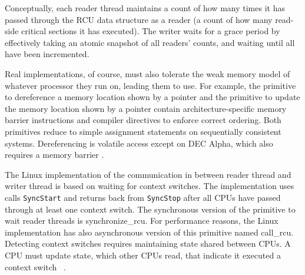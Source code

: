 Conceptually, each reader thread maintains a count of how many times it has passed through the RCU data structure as a reader (a count of how many read-side critical sections it has executed).  The writer waits for a grace period by effectively taking an atomic snapshot of all readers' counts, and waiting until all have been incremented.  

Real implementations, of course, must also tolerate the weak memory model of whatever processor they run on, leading them to use. For example, the primitive to dereference a memory location shown by a pointer and the primitive to update the memory location shown by a pointer contain architecture-specific memory barrier instructions and compiler directives to enforce correct ordering. Both primitives reduce to simple assignment statements on sequentially consistent systems. Dereferencing is volatile access except on DEC Alpha, which also requires a memory barrier .

The Linux implementation of the communication in between reader thread and writer thread is based on waiting for context switches. The implementation uses calls \lstinline|SyncStart| and returns back from \lstinline|SyncStop| after all CPUs have passed through at least one context switch. The synchronous version of the primitive to wait reader threads is \textsf{synchronize\_rcu}. For performance reasons, the Linux implementation has also asynchronous version of this primitive named \textsf{call\_rcu}. Detecting context switches requires maintaining state shared between CPUs. A CPU must update state, which other CPUs read, that indicate it executed a context switch ~\cite{Mckenney_rcuusage}.
